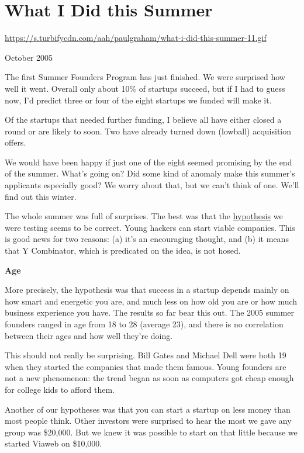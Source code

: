 \chapter{What I Did this Summer}

\href{https://s.turbifycdn.com/aah/paulgraham/what-i-did-this-summer-11.gif}{https://s.turbifycdn.com/aah/paulgraham/what-i-did-this-summer-11.gif}



October 2005

The first Summer Founders Program has just finished.  We were
surprised how well it went.  Overall only about 10\% of startups   
succeed, but if I had to guess now, I'd predict three or four of  
the eight startups we funded will make it.

Of the startups that needed further funding, I believe all have
either closed a round or are likely to soon.  Two have already
turned down (lowball) acquisition offers.

We would have been happy if just one of the eight seemed promising
by the end of the summer.  What's going on?  Did some kind of anomaly
make this summer's applicants especially good?  We worry about that,
but we can't think of one.  We'll find out this winter.

The whole summer was full of surprises.  The best was that the \href{http://www.paulgraham.com/hiring.html}{hypothesis} we were testing seems to be
correct.  Young hackers can start viable companies.  This is good
news for two reasons: (a) it's an encouraging thought, and (b) it 
means that Y Combinator, which is predicated on the idea, is not
hosed.

\textbf{Age}

More precisely, the hypothesis was that success in a startup depends
mainly on how smart and energetic you are, and much less on how old
you are or how much business experience you have.  The results so
far bear this out.  The 2005 summer founders ranged in age from 18  
to 28 (average 23), and there is no correlation between their ages
and how well they're doing.

This should not really be surprising. Bill Gates and Michael Dell 
were both 19 when they started the companies that made them famous.
Young founders are not a new phenomenon: the trend began as soon
as computers got cheap enough for college kids to afford them.

Another of our hypotheses was that you can start a startup on less
money than most people think.  Other investors were surprised to
hear the most we gave any group was \$20,000.  But we knew it was
possible to start on that little because we started Viaweb on
\$10,000.


